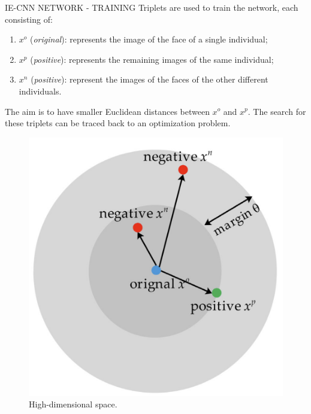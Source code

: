 \begin{frame}{IE-CNN NETWORK - TRAINING}
    Triplets are used to train the network, each consisting of:
    \begin{enumerate}
        \item $x^o$ (\emph{original}): represents the image of the face of a single individual;
        \item $x^p$ (\emph{positive}): represents the remaining images of the same individual;
        \item $x^n$ (\emph{positive}): represent the images of the faces of the other different 
        individuals.
    \end{enumerate}
    The aim is to have smaller Euclidean distances between $x^o$ and $x^p$. The 
    search for these triplets can be traced back to an optimization problem.
    \begin{figure}[h!]
        \centering
        \includegraphics[width = 0.3\linewidth]{images/paper9/SET.png}
        \centering
        \caption{High-dimensional space.}
        \label{fig:HDS}
    \end{figure}
\end{frame}

